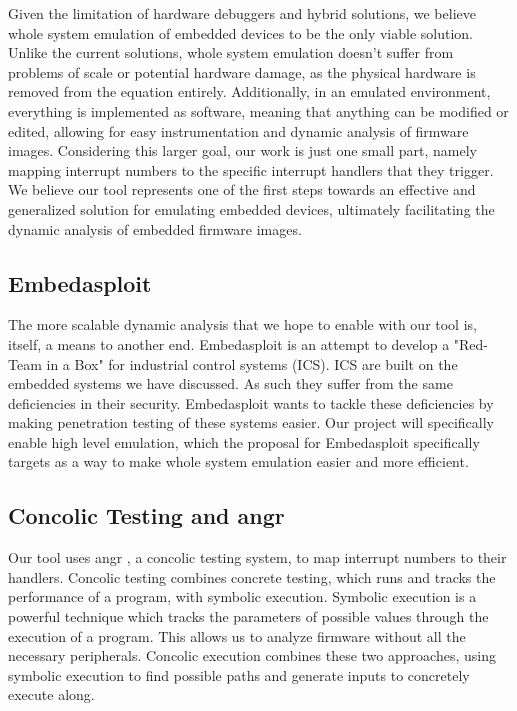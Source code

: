 \documentclass[letterpaper, 10 pt, conference]{ieeeconf}
\begin{document}
Given the limitation of hardware debuggers and hybrid solutions, we believe whole system emulation of embedded devices to be the only viable solution. Unlike the current solutions, whole system emulation doesn't suffer from problems of scale or potential hardware damage, as the physical hardware is removed from the equation entirely. Additionally, in an emulated environment, everything is implemented as software, meaning that anything can be modified or edited, allowing for easy instrumentation and dynamic analysis of firmware images. Considering this larger goal, our work is just one small part, namely mapping interrupt numbers to the specific interrupt handlers that they trigger. We believe our tool represents one of the first steps towards an effective and generalized solution for emulating embedded devices, ultimately facilitating the dynamic analysis of embedded firmware images.

\subsection{Embedasploit} %
The more scalable dynamic analysis that we hope to enable with our tool is, itself, a means to another end. Embedasploit is an attempt to develop a "Red-Team in a Box" for industrial control systems (ICS). ICS are built on the embedded systems we have discussed. As such they suffer from the same deficiencies in their security. Embedasploit wants to tackle these deficiencies by making penetration testing of these systems easier. Our project will specifically enable high level emulation, which the proposal for Embedasploit specifically targets as a way to make whole system emulation easier and more efficient.

\subsection{Concolic Testing and angr} %
Our tool uses angr \cite{angr}, a concolic testing system, to map interrupt numbers to their handlers. Concolic testing combines concrete testing, which runs and tracks the performance of a program, with symbolic execution. Symbolic execution is a powerful technique which tracks the parameters of possible values through the execution of a program. This allows us to analyze firmware without all the necessary peripherals. Concolic execution combines these two approaches, using symbolic execution to find possible paths and generate inputs to concretely execute along. 
\end{document}
